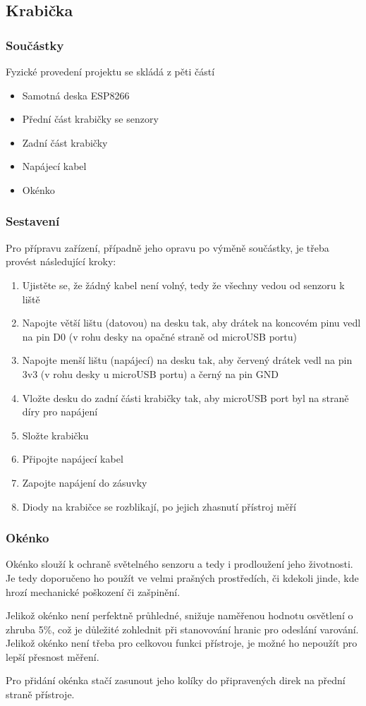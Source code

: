 \subsection{Krabička}
\subsubsection{Součástky}
Fyzické provedení projektu se skládá z pěti částí
\begin{itemize}
    \item Samotná deska ESP8266
    \item Přední část krabičky se senzory
    \item Zadní část krabičky
    \item Napájecí kabel
    \item Okénko
\end{itemize}
\subsubsection{Sestavení}
Pro přípravu zařízení, případně jeho opravu po výměně součástky, je třeba provést následující kroky:
\begin{enumerate}
    \item Ujistěte se, že žádný kabel není volný, tedy že všechny vedou od senzoru k liště
    \item Napojte větší lištu (datovou) na desku tak, aby drátek na koncovém pinu vedl na pin D0 (v rohu desky na opačné straně od microUSB portu)
    \item Napojte menší lištu (napájecí) na desku tak, aby červený drátek vedl na pin 3v3 (v rohu desky u microUSB portu) a černý na pin GND
    \item Vložte desku do zadní části krabičky tak, aby microUSB port byl na straně díry pro napájení
    \item Složte krabičku
    \item Připojte napájecí kabel
    \item Zapojte napájení do zásuvky
    \item Diody na krabičce se rozblikají, po jejich zhasnutí přístroj měří
\end{enumerate}
\subsubsection{Okénko}
Okénko slouží k ochraně světelného senzoru a tedy i prodloužení jeho životnosti. Je tedy doporučeno ho použít ve velmi prašných prostředích, či kdekoli jinde, kde hrozí mechanické poškození či zašpinění.

Jelikož okénko není perfektně průhledné, snižuje naměřenou hodnotu osvětlení o zhruba 5\%, což je důležité zohlednit při stanovování hranic pro odeslání varování. Jelikož okénko není třeba pro celkovou funkci přístroje, je možné ho nepoužít pro lepší přesnost měření.

Pro přidání okénka stačí zasunout jeho kolíky do připravených direk na přední straně přístroje.